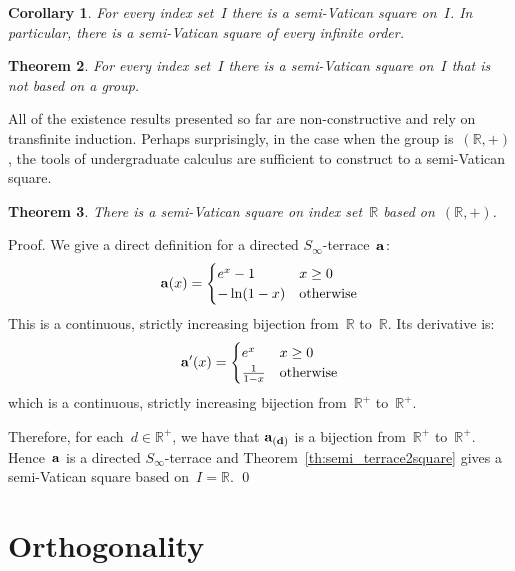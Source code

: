 \documentclass[12pt,a4paper]{article}
\newtheorem{thm}{Theorem}[section]
\newtheorem{cor}[thm]{Corollary}
\newcommand{\R}{\mathbb{R}}
\begin{document}
\begin{cor}\label{cor:semi_vatsquares}
For every index set~$I$ there is a semi-Vatican square on~$I$.  In particular, there is a semi-Vatican square of every infinite order.
\end{cor}

\begin{thm}\label{th:semi_infvat}
For every index set~$I$ there is a semi-Vatican square on~$I$ that is not based on a  group.
\end{thm}

All of the existence results presented so far are non-constructive and rely on transfinite induction.  Perhaps surprisingly, in the case when the group is~$(\R, +)$, the tools of undergraduate calculus are sufficient to construct to a semi-Vatican square.


\begin{thm}\label{th:svr}
There is a semi-Vatican square on index set~$\R$ based on~$(\R,+)$.
\end{thm} 

\noindent
Proof.   We give a direct definition for a directed $S_{\infty}$-terrace~${\bf a}$:
\begin{equation*}
    {\bf a}(x) = \begin{cases}
               e^x   -1            & x \geq 0\\
               -\ln (1-x)       & \text{otherwise}
           \end{cases}
\end{equation*}
This is a continuous, strictly increasing bijection from~$\R$ to~$\R$.  Its derivative is:
\begin{equation*}
    {\bf a}'(x) = \begin{cases}
               e^x               & x \geq 0\\
              \frac{1}{1-x}       & \text{otherwise}
           \end{cases}
\end{equation*}
which is a continuous, strictly increasing bijection from~$\R^+$ to~$\R^+$.

Therefore, for each~$d \in \R^+$, we have that ${\bf a_{(d)}}$ is a bijection from~$\R^+$ to~$\R^+$.  Hence~${\bf a}$ is a directed $S_{\infty}$-terrace and Theorem~\ref{th:semi_terrace2square} gives a semi-Vatican square based on~$I = \R$.
\qed





\section{Orthogonality}\label{sec:orth}
\end{document}
